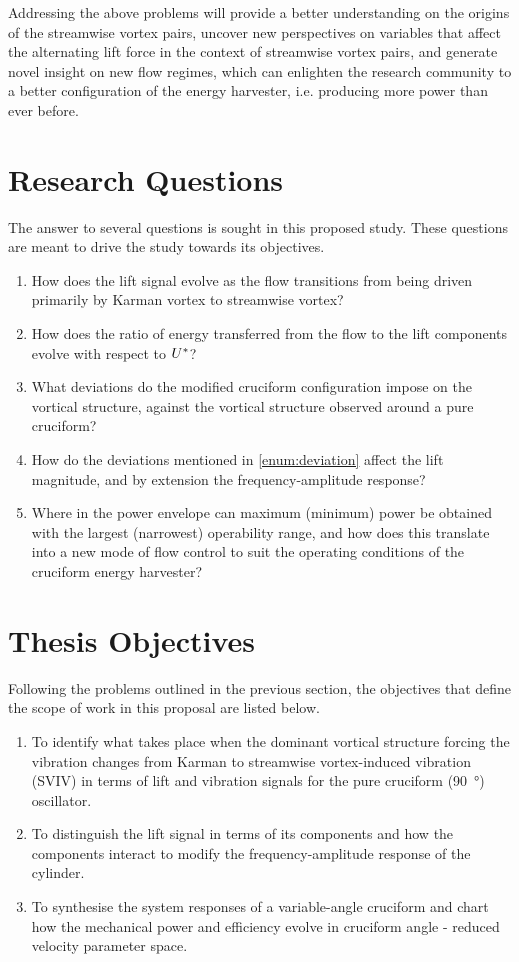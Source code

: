 \documentclass[oneside]{utmthesis}
\begin{document}
Addressing the above problems will provide a better understanding on the origins of the streamwise vortex pairs, uncover new perspectives on variables that affect the alternating lift force in the context of streamwise vortex pairs, and generate novel insight on new flow regimes, which can enlighten the research community to a better configuration of the energy harvester, i.e. producing more power than ever before.

\section{Research Questions}

The answer to several questions is sought in this proposed study. These questions are meant to drive the study towards its objectives.
\begin{enumerate}
  \item How does the lift signal evolve as the flow transitions from being driven primarily by Karman vortex to streamwise vortex?
  \item How does the ratio of energy transferred from the flow to the lift components evolve with respect to $U^{*}$?
  \item What deviations do the modified cruciform configuration impose on the vortical structure, against the vortical structure observed around a pure cruciform? \label{enum:deviation}
  \item How do the deviations mentioned in \ref{enum:deviation} affect the lift magnitude, and by extension the frequency-amplitude response?
  \item Where in the power envelope can maximum (minimum) power be obtained with the largest (narrowest) operability range, and how does this translate into a new mode of flow control to suit the operating conditions of the cruciform energy harvester?
\end{enumerate}

\section{Thesis Objectives}
Following the problems outlined in the previous section, the objectives that define the scope of work in this proposal are listed below.

\begin{enumerate}
  \item To identify what takes place when the dominant vortical structure forcing the vibration changes from Karman to streamwise vortex-induced vibration (SVIV) in terms of lift and vibration signals for the pure cruciform (\SI{90}{\degree}) oscillator. \label{enum:whatHappens}
  \item To distinguish the lift signal in terms of its components and how the components interact to modify the frequency-amplitude response of the cylinder. \label{enum:characteriseLift}
  \item To synthesise the system responses of a variable-angle cruciform and chart how the mechanical power and efficiency evolve in cruciform angle - reduced velocity parameter space. \label{enum:passiveControl}
\end{enumerate}
\end{document}
